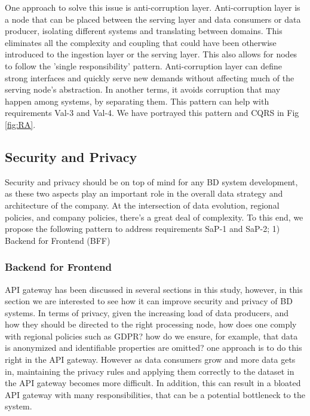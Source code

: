 \documentclass[a4paper,11pt,article,oneside]{memoir}
\begin{document}
One approach to solve this issue is anti-corruption layer. Anti-corruption layer is a node that can be placed between the serving layer and data consumers or data producer, isolating different systems and translating between domains. This eliminates all the complexity and coupling that could have been otherwise introduced to the ingestion layer or the serving layer. This also allows for nodes to follow the 'single responsibility' pattern. Anti-corruption layer can define strong interfaces and quickly serve new demands without affecting much of the serving node's abstraction. In another terms, it avoids corruption that may happen among systems, by separating them. This pattern can help with requirements Val-3 and Val-4. We have portrayed this pattern and CQRS in Fig \ref{fig:RA}.


\subsection{Security and Privacy}

Security and privacy should be on top of mind for any BD system development, as these two aspects play an important role in the overall data strategy and architecture of the company. At the intersection of data evolution, regional policies, and company policies, there's a great deal of complexity. To this end, we propose the following pattern to address requirements SaP-1 and SaP-2; 1) Backend for Frontend (BFF)

\subsubsection{Backend for Frontend}

API gateway has been discussed in several sections in this study, however, in this section we are interested to see how it can improve security and privacy of BD systems. In terms of privacy, given the increasing load of data producers, and how they should be directed to the right processing node, how does one comply with regional policies such as GDPR? how do we ensure, for example, that data is anonymized and identifiable properties are omitted? one approach is to do this right in the API gateway. However as data consumers grow and more data gets in, maintaining the privacy rules and applying them correctly to the dataset in the API gateway becomes more difficult. In addition, this can result in a bloated API gateway with many responsibilities, that can be a potential bottleneck to the system.
\end{document}
